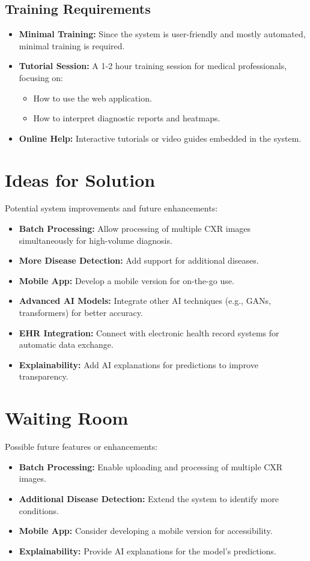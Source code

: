 \documentclass[12pt]{article}
\begin{document}
\subsection{Training Requirements}
\begin{itemize}
    \item \textbf{Minimal Training:} Since the system is user-friendly and mostly automated, 
    minimal training is required.
    \item \textbf{Tutorial Session:} A 1-2 hour training session for medical professionals, 
    focusing on:
    \begin{itemize}
        \item How to use the web application.
        \item How to interpret diagnostic reports and heatmaps.
    \end{itemize}
    \item \textbf{Online Help:} Interactive tutorials or video guides embedded in the system.
\end{itemize}


\section{Ideas for Solution}
Potential system improvements and future enhancements:
\begin{itemize}
    \item \textbf{Batch Processing:} Allow processing of multiple CXR images simultaneously for 
    high-volume diagnosis.
    \item \textbf{More Disease Detection:} Add support for additional diseases.
    \item \textbf{Mobile App:} Develop a mobile version for on-the-go use.
    \item \textbf{Advanced AI Models:} Integrate other AI techniques (e.g., GANs, transformers) 
    for better accuracy.
    \item \textbf{EHR Integration:} Connect with electronic health record systems for automatic 
    data exchange.
    \item \textbf{Explainability:} Add AI explanations for predictions to improve transparency.
\end{itemize}

\section{Waiting Room}
Possible future features or enhancements:
\begin{itemize}
    \item \textbf{Batch Processing:} Enable uploading and processing of multiple CXR images.
    \item \textbf{Additional Disease Detection:} Extend the system to identify more conditions.
    \item \textbf{Mobile App:} Consider developing a mobile version for accessibility.
    \item \textbf{Explainability:} Provide AI explanations for the model's predictions.
\end{itemize}
\end{document}
